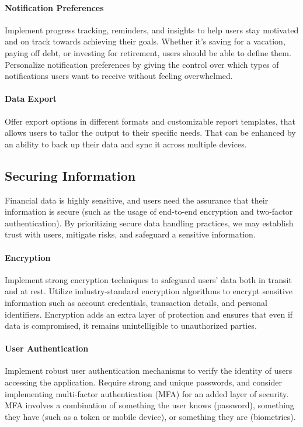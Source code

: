 \paragraph{Notification Preferences}
Implement progress tracking, reminders, and insights to help users stay motivated and on track towards achieving their 
goals. Whether it's saving for a vacation, paying off debt, or investing for retirement, users should be able to define 
them. Personalize notification preferences by giving the control over which types of notifications users want to receive 
without feeling overwhelmed.

\paragraph{Data Export}
Offer export options in different formats and customizable report templates, that allows users to tailor the output to 
their specific needs. That can be enhanced by an ability to back up their data and sync it across multiple devices.


\subsection{Securing Information}

Financial data is highly sensitive, and users need the assurance that their information is secure (such as the usage of 
end-to-end encryption and two-factor authentication). By prioritizing secure data handling practices, we may establish 
trust with users, mitigate risks, and safeguard a sensitive information.

\paragraph{Encryption}
Implement strong encryption techniques to safeguard users' data both in transit and at rest. Utilize 
industry-standard encryption algorithms to encrypt sensitive information such as account credentials, transaction 
details, and personal identifiers. Encryption adds an extra layer of protection and ensures that even if data is 
compromised, it remains unintelligible to unauthorized parties.

\paragraph{User Authentication}
Implement robust user authentication mechanisms to verify the identity of users accessing the application. Require strong 
and unique passwords, and consider implementing multi-factor authentication (MFA) for an added layer of security. MFA 
involves a combination of something the user knows (password), something they have (such as a token or mobile device), 
or something they are (biometrics).

